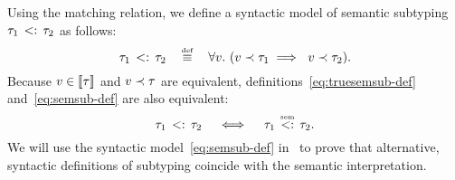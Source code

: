 Using the matching relation, we define a syntactic model of
semantic subtyping $\tau_1 \, <: \, \tau_2$ as follows:
\begin{equation}\label{eq:semsub-def}
\bjsemsub{\ty_1}{\ty_2} \quad \defsign \quad
\forall \vty.\ (\bjmtch{\vty}{\ty_1} \implies\ \bjmtch{\vty}{\ty_2}).
\end{equation}
Because $v \in \llbracket \tau \rrbracket$ and $v \prec \tau$
are equivalent, definitions~\eqref{eq:truesemsub-def} and~\eqref{eq:semsub-def}
are also equivalent:
\begin{equation}
\bjsemsub{\ty_1}{\ty_2} \quad \iff \quad \bjtruesemsub{\ty_1}{\ty_2}.
\end{equation}
We will use the syntactic model~\eqref{eq:semsub-def}
in~
to prove that alternative, syntactic definitions of subtyping
coincide with the semantic interpretation.


